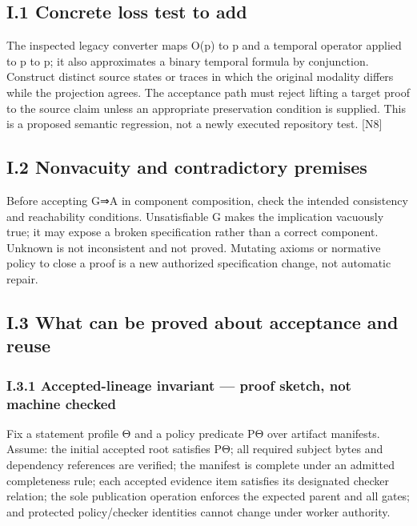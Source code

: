\subsection*{I.1 Concrete loss test to add}

The inspected legacy converter maps O(p) to p and a temporal operator applied to p to p; it also
approximates a binary temporal formula by conjunction. Construct distinct source states or traces
in which the original modality differs while the projection agrees. The acceptance path must reject
lifting a target proof to the source claim unless an appropriate preservation condition is supplied. This
is a proposed semantic regression, not a newly executed repository test. [N8]

\subsection*{I.2 Nonvacuity and contradictory premises}

Before accepting G⇒A in component composition, check the intended consistency and reachability
conditions. Unsatisfiable G makes the implication vacuously true; it may expose a broken specification
rather than a correct component. Unknown is not inconsistent and not proved. Mutating axioms or
normative policy to close a proof is a new authorized specification change, not automatic repair.

\subsection*{I.3 What can be proved about acceptance and reuse}

\subsubsection*{I.3.1 Accepted-lineage invariant — proof sketch, not machine checked}
Fix a statement profile Θ and a policy predicate PΘ over artifact manifests. Assume: the initial
accepted root satisfies PΘ; all required subject bytes and dependency references are verified; the
manifest is complete under an admitted completeness rule; each accepted evidence item satisfies its
designated checker relation; the sole publication operation enforces the expected parent and all gates;
and protected policy/checker identities cannot change under worker authority.


